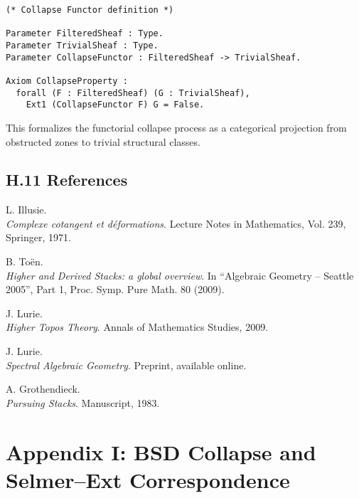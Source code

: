 \documentclass[11pt]{article}
\begin{document}
\begin{lstlisting}[language=Coq, caption=Collapse Functor Typing]
(* Collapse Functor definition *)

Parameter FilteredSheaf : Type.
Parameter TrivialSheaf : Type.
Parameter CollapseFunctor : FilteredSheaf -> TrivialSheaf.

Axiom CollapseProperty :
  forall (F : FilteredSheaf) (G : TrivialSheaf),
    Ext1 (CollapseFunctor F) G = False.
\end{lstlisting}

This formalizes the functorial collapse process as a categorical projection from obstructed zones to trivial structural classes.


\subsection*{H.11 References}

\begin{thebibliography}{9}

L. Illusie.\\
\textit{Complexe cotangent et déformations}.  
Lecture Notes in Mathematics, Vol. 239, Springer, 1971.

B. Toën.\\
\textit{Higher and Derived Stacks: a global overview}.  
In “Algebraic Geometry – Seattle 2005”, Part 1, Proc. Symp. Pure Math. 80 (2009).

J. Lurie.\\
\textit{Higher Topos Theory}.  
Annals of Mathematics Studies, 2009.

J. Lurie.\\
\textit{Spectral Algebraic Geometry}.  
Preprint, available online.

A. Grothendieck.\\
\textit{Pursuing Stacks}.  
Manuscript, 1983.

\end{thebibliography}




\section*{Appendix I: BSD Collapse and Selmer–Ext Correspondence}
\end{document}

